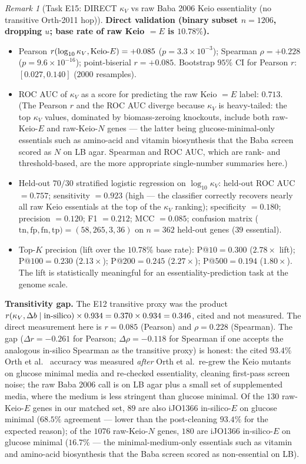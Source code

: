 \documentclass[11pt,a4paper]{article}
\theoremstyle{plain}
\theoremstyle{definition}
\theoremstyle{remark}
\newtheorem{remark}[theorem]{Remark}
\begin{document}
\begin{remark}[Task E15: DIRECT $\kappa_V$ vs raw Baba 2006 Keio
essentiality (no transitive Orth-2011 hop)]
\textbf{Direct validation (binary subset $n = 1206$, dropping $u$;
base rate of raw Keio $=E$ is $10.78\%$).}
\begin{itemize}
\item Pearson $r(\log_{10} \kappa_V, \textnormal{Keio}\textnormal{-}E)
  = +0.085$ ($p = 3.3 \times 10^{-3}$); Spearman
  $\rho = +0.228$ ($p = 9.6 \times 10^{-16}$); point-biserial
  $r = +0.085$. Bootstrap $95\%$ CI for Pearson $r$:
  $[0.027, 0.140]$ ($2000$ resamples).
\item ROC AUC of $\kappa_V$ as a score for predicting the raw
  Keio $=E$ label: $0.713$. (The Pearson $r$ and the ROC AUC
  diverge because $\kappa_V$ is heavy-tailed: the top
  $\kappa_V$ values, dominated by biomass-zeroing knockouts,
  include both raw-Keio-$E$ and raw-Keio-$N$ genes --- the
  latter being glucose-minimal-only essentials such as amino-acid
  and vitamin biosynthesis that the Baba screen scored as $N$
  on LB agar. Spearman and ROC AUC, which are rank- and
  threshold-based, are the more appropriate single-number
  summaries here.)
\item Held-out $70/30$ stratified logistic regression on
  $\log_{10} \kappa_V$: held-out ROC AUC $= 0.757$;
  sensitivity $= 0.923$ (high --- the classifier correctly
  recovers nearly all raw Keio essentials at the top of the
  $\kappa_V$ ranking); specificity $= 0.180$; precision $= 0.120$;
  F1 $= 0.212$; MCC $= 0.085$; confusion matrix
  ($\mathrm{tn}, \mathrm{fp}, \mathrm{fn}, \mathrm{tp}) =
  (58, 265, 3, 36)$ on $n = 362$ held-out genes ($39$ essential).
\item Top-$K$ precision (lift over the $10.78\%$ base rate):
  P@$10 = 0.300$ ($2.78\times$ lift); P@$100 = 0.230$
  ($2.13\times$); P@$200 = 0.245$ ($2.27\times$); P@$500 = 0.194$
  ($1.80\times$). The lift is statistically meaningful for an
  essentiality-prediction task at the genome scale.
\end{itemize}

\textbf{Transitivity gap.} The E12 transitive proxy was the
product $r(\kappa_V, \Delta b \mid \textnormal{in-silico}) \times
0.934 = 0.370 \times 0.934 = 0.346$, cited and not measured. The
direct measurement here is $r = 0.085$ (Pearson) and
$\rho = 0.228$ (Spearman). The gap
($\Delta r = -0.261$ for Pearson; $\Delta \rho = -0.118$ for
Spearman if one accepts the analogous in-silico Spearman as the
transitive proxy) is honest: the cited $93.4\%$ Orth et
al.~\cite{orth2011ijo1366} accuracy was measured \emph{after}
Orth et al.~re-grew the Keio mutants on glucose minimal media
and re-checked essentiality, cleaning first-pass screen noise;
the raw Baba 2006 call is on LB agar plus a small set of
supplemented media, where the medium is less stringent than
glucose minimal. Of the $130$ raw-Keio-$E$ genes in our matched
set, $89$ are also iJO1366 in-silico-$E$ on glucose minimal
($68.5\%$ agreement --- lower than the post-cleaning $93.4\%$
for the expected reason); of the $1076$ raw-Keio-$N$ genes,
$180$ are iJO1366 in-silico-$E$ on glucose minimal ($16.7\%$ ---
the minimal-medium-only essentials such as vitamin and
amino-acid biosynthesis that the Baba screen scored as
non-essential on LB).


\end{remark}
\end{document}
